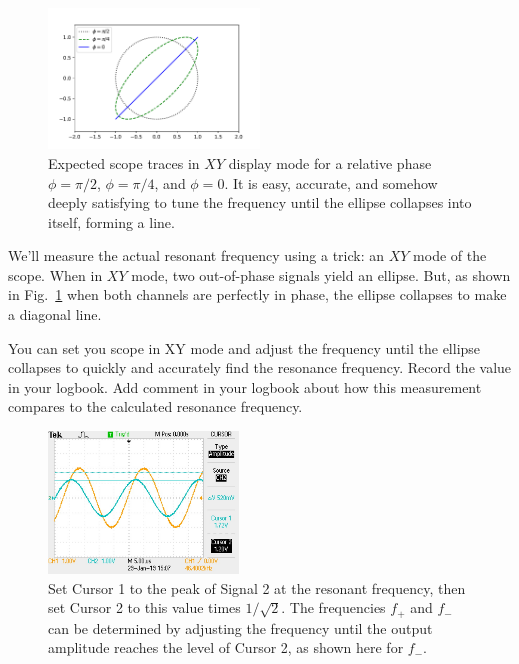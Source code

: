 \begin{figure}[htbp]
\begin{center}
\includegraphics[width=0.50\textwidth]{figs/labs/filters/scope_xy.pdf}
\end{center}
\caption{\label{fig:scopexy} 
Expected scope traces in $XY$ display mode for a relative phase $\phi=\pi/2$, 
$\phi=\pi/4$, and $\phi=0$.  It is easy, accurate, and somehow deeply satisfying to tune the frequency until the ellipse collapses into itself, forming a line.}
\end{figure}

We'll measure the actual resonant frequency using a trick: an $XY$ mode of the scope.  
When in $XY$ mode, two out-of-phase signals
yield an ellipse.  But, as shown in Fig.~\ref{fig:scopexy} when both
channels are perfectly in phase, the ellipse collapses to make a
diagonal line. 
\begin{measurement} You can set you scope in XY mode and adjust the
frequency until the ellipse collapses to quickly and accurately find
the resonance frequency. Record the value in your logbook. Add comment in your logbook about how this measurement  compares to the calculated resonance frequency.
\end{measurement}
\begin{figure}[htbp]
\begin{center}
\includegraphics[width=0.45\textwidth]{figs/labs/filters/qscope.jpg}
\end{center}
\caption{\label{fig:qscope} Set Cursor 1 to the peak of Signal 2 at the resonant frequency, then set Cursor 2 to this value times $1/\sqrt{2}$.  The frequencies $f_+$ and $f_-$ can be determined by adjusting the frequency until the output amplitude reaches the level of Cursor 2, as shown here for $f_-$.
}
\end{figure}


